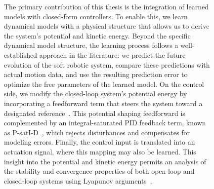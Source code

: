 \begin{figure}[ht]
{    The primary contribution of this thesis is the integration of learned models with closed-form controllers. To enable this, we learn dynamical models with a physical structure that allows us to derive the system’s potential and kinetic energy. Beyond the specific dynamical model structure, the learning process follows a well-established approach in the literature: we predict the future evolution of the soft robotic system, compare these predictions with actual motion data, and use the resulting prediction error to optimize the free parameters of the learned model.
    On the control side, we modify the closed-loop system’s potential energy by incorporating a feedforward term that steers the system toward a designated reference~\citep{della2023model}. This potential shaping feedforward is complemented by an integral-saturated PID feedback term, known as P-satI-D~\citep{pustina2022p}, which rejects disturbances and compensates for modeling errors. Finally, the control input is translated into an actuation signal, where this mapping may also be learned. This insight into the potential and kinetic energy permits an analysis of the stability and convergence properties of both open-loop and closed-loop systems using Lyapunov arguments~\citep{khalil2002nonlinear}.
    }
    \label{fig:introduction:model_based_control_with_learned_models}
\end{figure}


